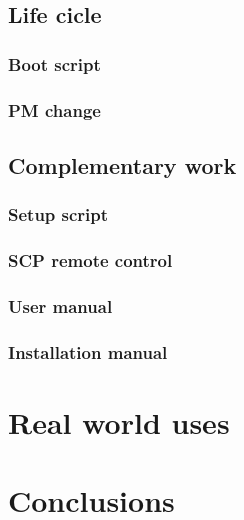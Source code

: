 	\section{Life cicle}
		\subsection{Boot script}
		\subsection{PM change}
	\section{Complementary work}
		\subsection{Setup script}
		\subsection{SCP remote control}
		\subsection{User manual}
		\subsection{Installation manual}
\chapter{Real world uses}
\chapter{Conclusions}
